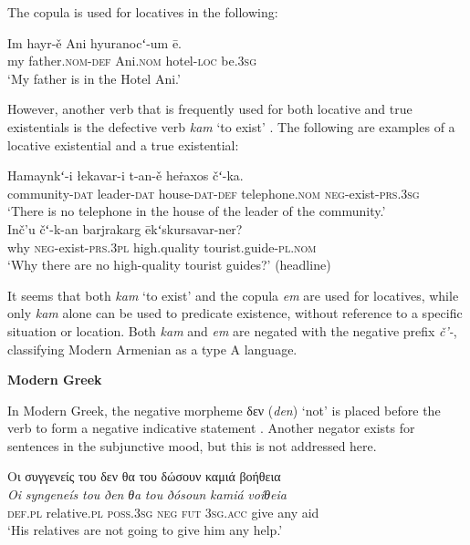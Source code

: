 ﻿\documentclass[output=paper]{langsci/langscibook}
\begin{document}
\begin{unindented}
The copula is used for locatives in the following:
%
\begin{exe}\ex \gll Im hayr-ě Ani hyuranocʻ-um ē.  \\
my father.\textsc{nom}-\textsc{def} Ani.\textsc{nom} hotel-\textsc{loc} be.\textsc{3sg} \\
    \glt `My father is in the Hotel Ani.' \parencite[382]{DumTragut2009}
    \end{exe}

However, another verb that is frequently used for both locative and true
existentials is the defective verb \textit{kam} `to exist' \parencite[282]{DumTragut2009}. The following are examples of a locative existential and a true existential:
%
\begin{exe}\ex \gll Hamaynkʻ-i łekavar-i t-an-ě heṙaxos čʻ-ka.  \\
community-\textsc{dat} leader-\textsc{dat} house-\textsc{dat-def} 
telephone.\textsc{nom} \textsc{neg}-exist-\textsc{prs.3sg} \\
    \glt `There is no telephone in the house of the leader of the
community.' \\
\parencite[104--105]{DumTragut2009}
\ex \gll Inč’u čʻ-k-an barjrakarg ēkʻskursavar-ner?  \\
why \textsc{neg}-exist-\textsc{prs.3pl} high.quality tourist.guide-\textsc{pl.nom} \\
    \glt `Why there are no high-quality tourist guides?' (headline)
\parencite[693]{DumTragut2009}
    \end{exe}

It seems that both \textit{kam} `to exist' and the copula \textit{em} are used for locatives, while only \textit{kam} alone can be used to predicate existence, without reference to a specific situation or location. Both \textit{kam} and \textit{em} are negated with the negative prefix \textit{č’-}, classifying Modern Armenian as a type A language. 

\textbf{Modern Greek}

In Modern Greek, the negative morpheme δεν
(\textit{den}) `not' is placed before the verb to form a negative
indicative statement \parencite[510]{HoltonMackridge2012}. Another negator exists for sentences in the subjunctive mood, but this is not addressed here. 
%
\begin{exe}\ex \glll
Οι συγγενείς του δεν θα του δώσουν καμιά βοήθεια \\
\textit{Oi} \textit{syngeneís} \textit{tou} \textit{ðen} \textit{θa} \textit{tou} \textit{ðósoun} \textit{kamiá} \textit{voíθeia}\\
\textsc{def.pl}  relative.\textsc{pl} \textsc{poss.3sg} \textsc{neg}  \textsc{fut} \textsc{3sg.acc} give any aid \\
    \glt `His relatives are not going to give him any help.' \parencite[510]{HoltonMackridge2012}
    \end{exe}


\end{unindented}
\end{document}
